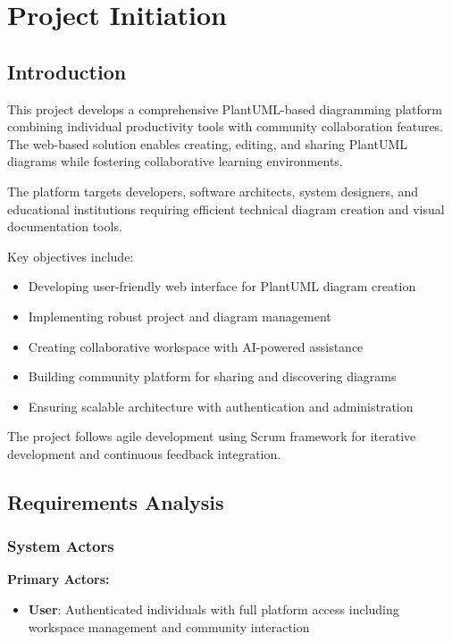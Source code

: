 \chapter{Project Initiation}

\section{Introduction}

This project develops a comprehensive PlantUML-based diagramming platform combining individual productivity tools with community collaboration features. The web-based solution enables creating, editing, and sharing PlantUML diagrams while fostering collaborative learning environments.

The platform targets developers, software architects, system designers, and educational institutions requiring efficient technical diagram creation and visual documentation tools.

Key objectives include:
\begin{itemize}
    \item Developing user-friendly web interface for PlantUML diagram creation
    \item Implementing robust project and diagram management
    \item Creating collaborative workspace with AI-powered assistance
    \item Building community platform for sharing and discovering diagrams
    \item Ensuring scalable architecture with authentication and administration
\end{itemize}

The project follows agile development using Scrum framework for iterative development and continuous feedback integration.

\section{Requirements Analysis}

\subsection{System Actors}

\textbf{Primary Actors:}
\begin{itemize}
    \item \textbf{User}: Authenticated individuals with full platform access including workspace management and community interaction
\end{itemize}

